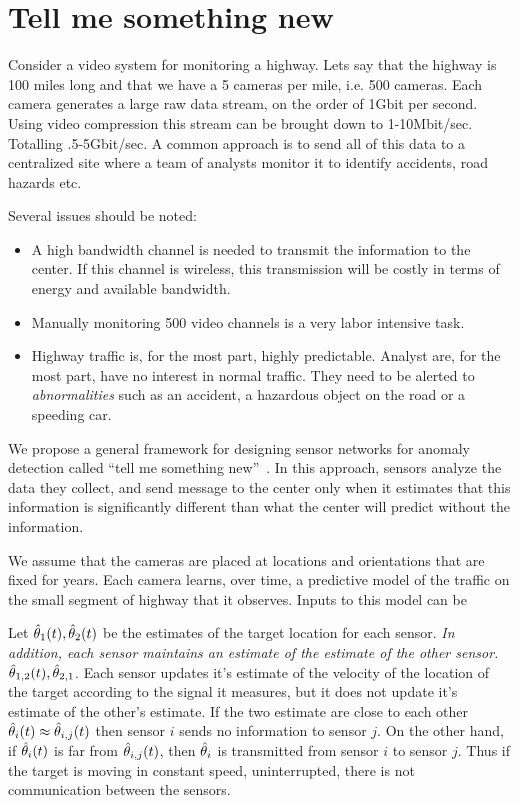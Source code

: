\section{Tell me something new}

Consider a video system for monitoring a highway. Lets say that the
highway is 100 miles long and that we have a 5 cameras per mile,
i.e. 500 cameras. Each camera generates a large raw data stream, on
the order of 1Gbit per second. Using video compression this stream can
be brought down to 1-10Mbit/sec. Totalling .5-5Gbit/sec. A common approach
is to send all of this data to a centralized site where a team of
analysts monitor it to identify accidents, road hazards etc.

Several issues should be noted:
\begin{itemize}
\item A high bandwidth channel is needed to transmit the information
  to the center. If this channel is wireless, this transmission will
  be costly in terms of energy and available bandwidth.
\item Manually monitoring 500 video channels is a very labor intensive task. 
\item Highway traffic is, for the most part, highly
  predictable. Analyst are, for the most part, have no interest in normal traffic. 
  They need to be alerted to {\em abnormalities} such as an accident, a hazardous 
  object on the road or a speeding car.
\end{itemize}

We propose a general framework for designing sensor networks for
anomaly detection called ``tell me something new''~\cite{TMSN}. In
this approach, sensors analyze the data they collect, and send message
to the center only when it estimates that this information is
significantly different than what the center will predict without the
information.

We assume that the cameras are placed at locations and orientations that are fixed for years.
Each camera learns, over time, a predictive model of the traffic on the small segment of 
highway that it observes. Inputs to this model can be 


Let $\hat{\theta}_1(t),\hat{\theta}_2(t)$ be the estimates of the target
location for each sensor. {\em In addition, each sensor maintains an
  estimate of the estimate of the other sensor.}
$\hat{\theta}_{1,2}(t),\hat{\theta}_{2,1}$. Each sensor updates it's estimate of
the velocity of the location of the target according to the signal it
measures, but it does not update it's estimate of the other's
estimate.  If the two estimate are close to each other $\hat{\theta}_i(t)
\approx \hat{\theta}_{i,j}(t)$ then sensor $i$ sends no information to
sensor $j$. On the other hand, if $\hat{\theta}_i(t)$ is far from
$\hat{\theta}_{i,j}(t)$, then $\hat{\theta}_{i}$ is transmitted from sensor $i$
to sensor $j$. Thus if the target is moving in constant speed,
uninterrupted, there is not communication between the sensors.


